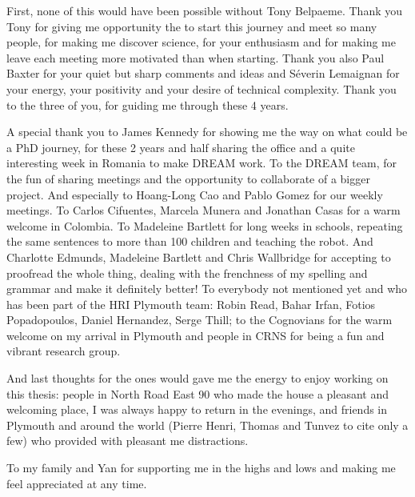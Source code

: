 First, none of this would have been possible without Tony Belpaeme. Thank you Tony for giving me opportunity the to start this journey and meet so many people, for making me discover science, for your enthusiasm and for making me leave each meeting more motivated than when starting. Thank you also Paul Baxter for your quiet but sharp comments and ideas %
and S\'{e}verin Lemaignan for your energy, your positivity and your desire of technical complexity. Thank you to the three of you, for guiding me through these 4 years.

A special thank you to James Kennedy for showing me the way on what could be a PhD journey, for these 2 years and half sharing the office and a quite interesting week in Romania to make DREAM work. To the DREAM team, for the fun of sharing meetings and the opportunity to collaborate of a bigger project. And especially to Hoang-Long Cao and Pablo Gomez for our weekly meetings. To Carlos Cifuentes, Marcela Munera and Jonathan Casas for a warm welcome in Colombia. To Madeleine Bartlett for long weeks in schools, repeating the same sentences to more than 100 children and teaching the robot. And Charlotte Edmunds, Madeleine Bartlett and Chris Wallbridge for accepting to proofread the whole thing, dealing with the frenchness of my spelling and grammar and make it definitely better! To everybody not mentioned yet and who has been part of the HRI Plymouth team: Robin Read, Bahar Irfan, Fotios Popadopoulos, Daniel Hernandez, Serge Thill; to the Cognovians for the warm welcome on my arrival in Plymouth and people in CRNS for being a fun and vibrant research group.

And last thoughts for the ones would gave me the energy to enjoy working on this thesis: people in North Road East 90 who made the house a pleasant and welcoming place, I was always happy to return in the evenings, and friends in Plymouth and around the world (Pierre Henri, Thomas and Tunvez to cite only a few) who provided with pleasant me distractions.

To my family and Yan for supporting me in the highs and lows and making me feel appreciated at any time.
